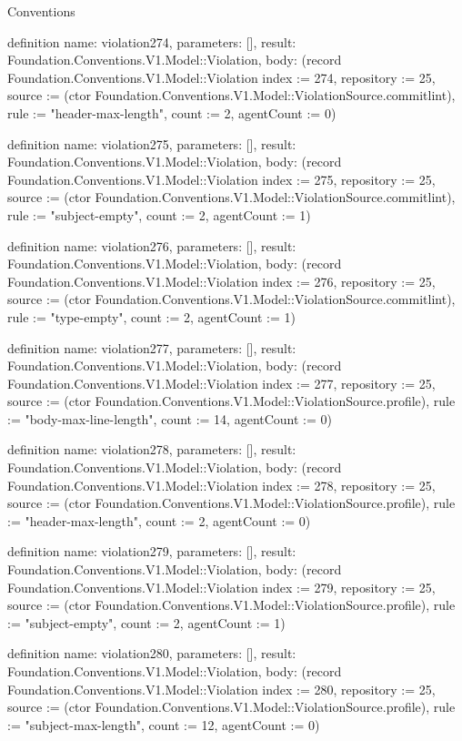 \begin{lexlean}{Conventions}
\begin{semanticmodule}
definition{
  name: violation274,
  parameters: [],
  result: Foundation.Conventions.V1.Model::Violation,
  body: (record Foundation.Conventions.V1.Model::Violation {index := 274, repository := 25, source := (ctor Foundation.Conventions.V1.Model::ViolationSource.commitlint), rule := "header-max-length", count := 2, agentCount := 0})
}

definition{
  name: violation275,
  parameters: [],
  result: Foundation.Conventions.V1.Model::Violation,
  body: (record Foundation.Conventions.V1.Model::Violation {index := 275, repository := 25, source := (ctor Foundation.Conventions.V1.Model::ViolationSource.commitlint), rule := "subject-empty", count := 2, agentCount := 1})
}

definition{
  name: violation276,
  parameters: [],
  result: Foundation.Conventions.V1.Model::Violation,
  body: (record Foundation.Conventions.V1.Model::Violation {index := 276, repository := 25, source := (ctor Foundation.Conventions.V1.Model::ViolationSource.commitlint), rule := "type-empty", count := 2, agentCount := 1})
}

definition{
  name: violation277,
  parameters: [],
  result: Foundation.Conventions.V1.Model::Violation,
  body: (record Foundation.Conventions.V1.Model::Violation {index := 277, repository := 25, source := (ctor Foundation.Conventions.V1.Model::ViolationSource.profile), rule := "body-max-line-length", count := 14, agentCount := 0})
}

definition{
  name: violation278,
  parameters: [],
  result: Foundation.Conventions.V1.Model::Violation,
  body: (record Foundation.Conventions.V1.Model::Violation {index := 278, repository := 25, source := (ctor Foundation.Conventions.V1.Model::ViolationSource.profile), rule := "header-max-length", count := 2, agentCount := 0})
}

definition{
  name: violation279,
  parameters: [],
  result: Foundation.Conventions.V1.Model::Violation,
  body: (record Foundation.Conventions.V1.Model::Violation {index := 279, repository := 25, source := (ctor Foundation.Conventions.V1.Model::ViolationSource.profile), rule := "subject-empty", count := 2, agentCount := 1})
}

definition{
  name: violation280,
  parameters: [],
  result: Foundation.Conventions.V1.Model::Violation,
  body: (record Foundation.Conventions.V1.Model::Violation {index := 280, repository := 25, source := (ctor Foundation.Conventions.V1.Model::ViolationSource.profile), rule := "subject-max-length", count := 12, agentCount := 0})
}


\end{semanticmodule}
\end{lexlean}

